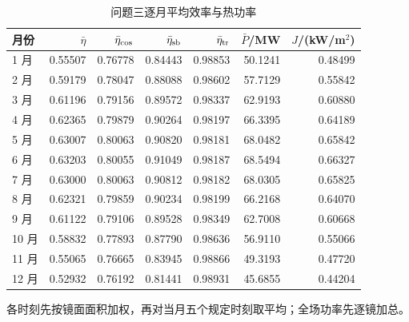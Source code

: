 \begin{table}[H]\centering\small
\caption{问题三逐月平均效率与热功率}\label{tab:q3_monthly}
\begin{tabular}{lrrrrrr}\toprule
月份 & $\bar\eta$ & $\bar\eta_{\rm cos}$ & $\bar\eta_{\rm sb}$ & $\bar\eta_{\rm tr}$ & $\bar P$/MW & $J$/(kW/m$^2$)\\\midrule
1 月 & 0.55507 & 0.76778 & 0.84443 & 0.98853 & 50.1241 & 0.48499\\
2 月 & 0.59179 & 0.78047 & 0.88088 & 0.98602 & 57.7129 & 0.55842\\
3 月 & 0.61196 & 0.79156 & 0.89572 & 0.98337 & 62.9193 & 0.60880\\
4 月 & 0.62365 & 0.79879 & 0.90264 & 0.98197 & 66.3395 & 0.64189\\
5 月 & 0.63007 & 0.80063 & 0.90820 & 0.98181 & 68.0482 & 0.65842\\
6 月 & 0.63203 & 0.80055 & 0.91049 & 0.98187 & 68.5494 & 0.66327\\
7 月 & 0.63000 & 0.80063 & 0.90812 & 0.98182 & 68.0305 & 0.65825\\
8 月 & 0.62321 & 0.79859 & 0.90234 & 0.98199 & 66.2168 & 0.64070\\
9 月 & 0.61122 & 0.79106 & 0.89528 & 0.98349 & 62.7008 & 0.60668\\
10 月 & 0.58832 & 0.77893 & 0.87790 & 0.98636 & 56.9110 & 0.55066\\
11 月 & 0.55065 & 0.76665 & 0.83945 & 0.98866 & 49.3193 & 0.47720\\
12 月 & 0.52932 & 0.76192 & 0.81441 & 0.98931 & 45.6855 & 0.44204\\
\bottomrule\end{tabular}
\par\smallskip\begin{minipage}{.94\linewidth}\footnotesize 各时刻先按镜面面积加权，再对当月五个规定时刻取平均；全场功率先逐镜加总。\end{minipage}
\end{table}
